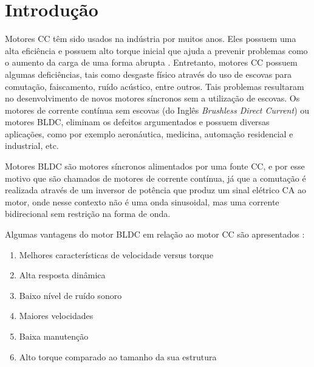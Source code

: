 \documentclass[
	12pt,				%
	openright,			%
	oneside,			%
	a4paper,			%
	english,			%
	french,				%
	spanish,			%
	brazil,				%
	]{abntex2}
\begin{document}
\tableofcontents*
\cleardoublepage


\textual

\chapter*[Introdução]{Introdução}

Motores CC têm sido usados na indústria por muitos anos. Eles possuem uma alta eficiência e possuem alto torque inicial que ajuda a prevenir problemas como o aumento da carga de uma forma abrupta \cite{dcPrinciples}. Entretanto, motores CC possuem algumas deficiências, tais como desgaste físico através do uso de escovas para comutação, faiscamento, ruído acústico, entre outros. Tais problemas resultaram no desenvolvimento de novos motores síncronos sem a utilização de escovas. Os motores de corrente contínua sem escovas (do Inglês \textit{Brushless Direct Current}) ou motores BLDC, eliminam os defeitos argumentados e possuem diversas aplicações, como por exemplo aeronáutica, medicina, automação residencial e industrial, etc.

Motores BLDC são motores síncronos alimentados por uma fonte CC, e por esse motivo que são chamados de motores de corrente contínua, já que a comutação é realizada através de um inversor de potência que produz um sinal elétrico CA ao motor, onde nesse contexto não é uma onda sinusoidal, mas uma corrente bidirecional sem restrição na forma de onda.

Algumas vantagens do motor BLDC em relação ao motor CC são apresentados \cite{brushFundamentals}:

\begin{enumerate}
	\item Melhores características de velocidade versus torque
	\item Alta resposta dinâmica
	\item Baixo nível de ruído sonoro
	\item Maiores velocidades
	\item Baixa manutenção
	\item Alto torque comparado ao tamanho da sua estrutura
\end{enumerate}
\end{document}
